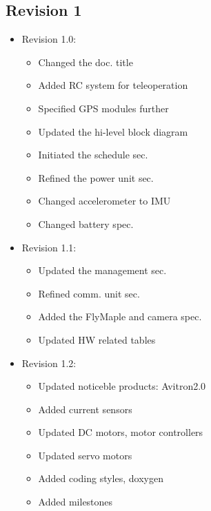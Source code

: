 \documentclass[a4paper, 10pt, twocolumn, titlepage]{article}
\begin{document}
\subsection{Revision 1}
  \begin{itemize}
  \itemsep-1mm
  \item Revision 1.0:
    \begin{itemize}
    \itemsep-1mm
        \item Changed the doc. title
        \item Added RC system for teleoperation
        \item Specified GPS modules further
        \item Updated the hi-level block diagram
        \item Initiated the schedule sec.
        \item Refined the power unit sec.
        \item Changed accelerometer to IMU
        \item Changed battery spec.
    \end{itemize}
  \item Revision 1.1:
    \begin{itemize}
    \itemsep-1mm
        \item Updated the management sec.
        \item Refined comm. unit sec.
        \item Added the FlyMaple and camera spec.
        \item Updated HW related tables
    \end{itemize}
  \item Revision 1.2:
    \begin{itemize}
    \itemsep-1mm
        \item Updated noticeble products: Avitron2.0
        \item Added current sensors
        \item Updated DC motors, motor controllers
        \item Updated servo motors
        \item Added coding styles, doxygen
        \item Added milestones
    \end{itemize}
  \end{itemize}
%
%
\end{document}
